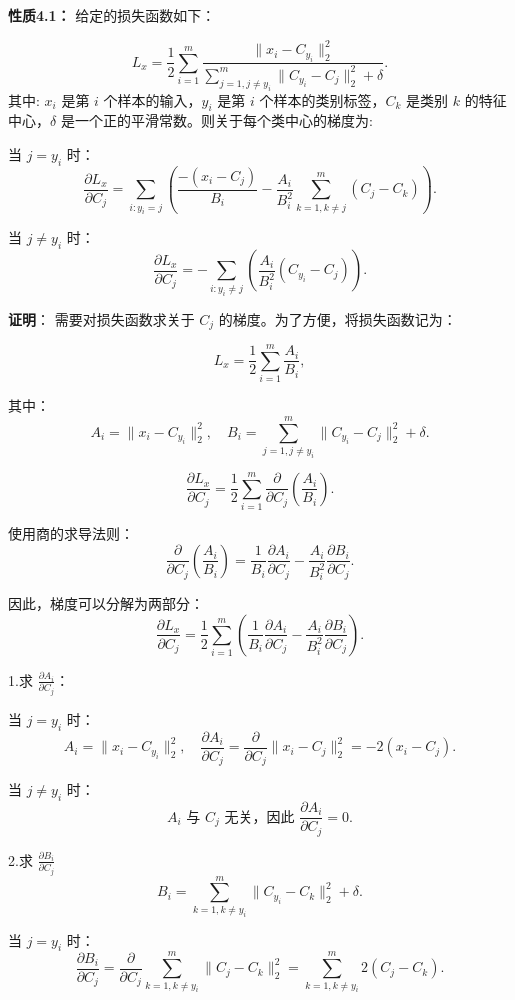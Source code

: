 \textbf{性质4.1：}
给定的损失函数如下：

\[
L_x = \frac{1}{2} \sum_{i=1}^m \frac{\|x_i - C_{y_i}\|_2^2}{\sum_{j=1, j \neq y_i}^{m} \|C_{y_i} - C_j\|_2^2 + \delta}.
\]
其中:
\( x_i \) 是第 \( i \) 个样本的输入，\( y_i \) 是第 \( i \) 个样本的类别标签，\( C_k \) 是类别 \( k \) 的特征中心，\( \delta \) 是一个正的平滑常数。则关于每个类中心的梯度为:


当 \( j = y_i \) 时：
\[
\frac{\partial L_x}{\partial C_j} =  \sum_{i: y_i = j} \left( \frac{- (x_i - C_j)}{B_i} - \frac{A_i}{B_i^2} \sum_{k=1, k \neq j}^m  (C_j - C_k) \right).
\]

当 \( j \neq y_i \) 时：
\[
\frac{\partial L_x}{\partial C_j} = -\sum_{i: y_i \neq j} \left( \frac{A_i}{B_i^2} (C_{y_i} - C_j) \right).
\]


\textbf{证明}：
需要对损失函数求关于 \( C_j \) 的梯度。为了方便，将损失函数记为：

\[
L_x = \frac{1}{2} \sum_{i=1}^m \frac{A_i}{B_i},
\]

其中：
\[
A_i = \|x_i - C_{y_i}\|_2^2, \quad B_i = \sum_{j=1, j \neq y_i}^m \|C_{y_i} - C_j\|_2^2 + \delta.
\]

\[
\frac{\partial L_x}{\partial C_j} = \frac{1}{2} \sum_{i=1}^m \frac{\partial}{\partial C_j} \left( \frac{A_i}{B_i} \right).
\]

使用商的求导法则：
\[
\frac{\partial}{\partial C_j} \left( \frac{A_i}{B_i} \right) = \frac{1}{B_i} \frac{\partial A_i}{\partial C_j} - \frac{A_i}{B_i^2} \frac{\partial B_i}{\partial C_j}.
\]

因此，梯度可以分解为两部分：
\[
\frac{\partial L_x}{\partial C_j} = \frac{1}{2} \sum_{i=1}^m \left( \frac{1}{B_i} \frac{\partial A_i}{\partial C_j} - \frac{A_i}{B_i^2} \frac{\partial B_i}{\partial C_j} \right).
\]

1.求 \( \frac{\partial A_i}{\partial C_j} \)：

当 \( j = y_i \) 时：
\[
A_i = \|x_i - C_{y_i}\|_2^2, \quad \frac{\partial A_i}{\partial C_j} = \frac{\partial}{\partial C_j} \|x_i - C_j\|_2^2 = -2 (x_i - C_j).
\]

当 \( j \neq y_i \) 时：
\[
A_i \text{ 与 } C_j \text{ 无关，因此 } \frac{\partial A_i}{\partial C_j} = 0.
\]

2.求 \( \frac{\partial B_i}{\partial C_j} \)
\[
B_i = \sum_{k=1, k \neq y_i}^m \|C_{y_i} - C_k\|_2^2 + \delta.
\]

当 \( j = y_i \) 时：
\[
\frac{\partial B_i}{\partial C_j} = \frac{\partial}{\partial C_j} \sum_{k=1, k \neq y_i}^m \|C_j - C_k\|_2^2 = \sum_{k=1, k \neq y_i}^m 2 (C_j - C_k).
\]

